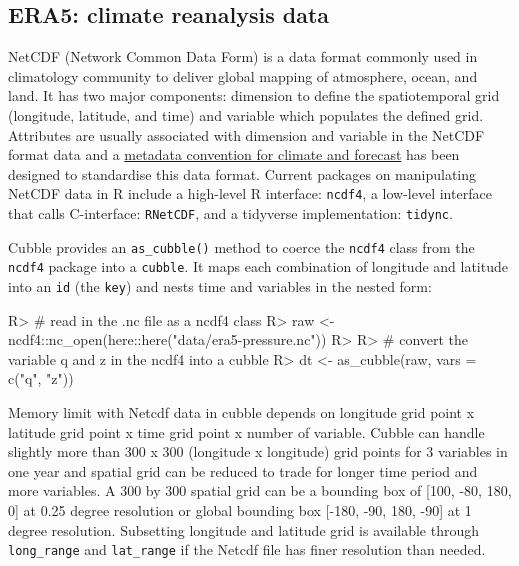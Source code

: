 \documentclass[
]{jss}
\begin{document}
\hypertarget{era5-climate-reanalysis-data}{%
\subsection{ERA5: climate reanalysis
data}\label{era5-climate-reanalysis-data}}

NetCDF (Network Common Data Form) is a data format commonly used in
climatology community to deliver global mapping of atmosphere, ocean,
and land. It has two major components: dimension to define the
spatiotemporal grid (longitude, latitude, and time) and variable which
populates the defined grid. Attributes are usually associated with
dimension and variable in the NetCDF format data and a
\href{http://cfconventions.org/}{metadata convention for climate and
forecast} has been designed to standardise this data format. Current
packages on manipulating NetCDF data in R include a high-level R
interface: \texttt{ncdf4}\citep{ncdf4}, a low-level interface that calls
C-interface: \texttt{RNetCDF}\citep{rnetcdf, michna2013rnetcdf}, and a
tidyverse implementation: \texttt{tidync}\citep{tidync}.

Cubble provides an \texttt{as\_cubble()} method to coerce the
\texttt{ncdf4} class from the \texttt{ncdf4} package into a
\texttt{cubble}. It maps each combination of longitude and latitude into
an \texttt{id} (the \texttt{key}) and nests time and variables in the
nested form:

\begin{CodeChunk}
\begin{CodeInput}
R> # read in the .nc file as a ncdf4 class
R> raw <- ncdf4::nc_open(here::here("data/era5-pressure.nc"))
R> 
R> # convert the variable q and z in the ncdf4 into a cubble
R> dt <- as_cubble(raw, vars = c("q", "z"))
\end{CodeInput}
\end{CodeChunk}

Memory limit with Netcdf data in cubble depends on longitude grid point
x latitude grid point x time grid point x number of variable. Cubble can
handle slightly more than 300 x 300 (longitude x longitude) grid points
for 3 variables in one year and spatial grid can be reduced to trade for
longer time period and more variables. A 300 by 300 spatial grid can be
a bounding box of {[}100, -80, 180, 0{]} at 0.25 degree resolution or
global bounding box {[}-180, -90, 180, -90{]} at 1 degree resolution.
Subsetting longitude and latitude grid is available through
\texttt{long\_range} and \texttt{lat\_range} if the Netcdf file has
finer resolution than needed.
\end{document}
